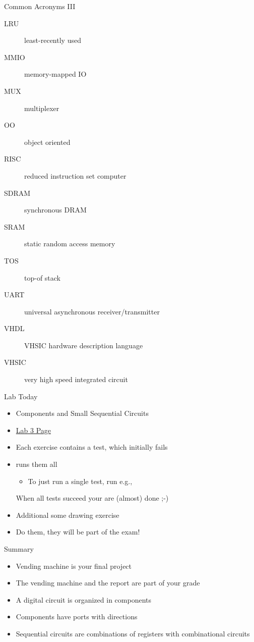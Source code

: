 \begin{frame}[fragile]{Common Acronyms III}
\begin{description}
\item [LRU] least-recently used
\item [MMIO] memory-mapped IO
\item [MUX] multiplexer
\item [OO] object oriented
\item [RISC] reduced instruction set computer
\item [SDRAM] synchronous DRAM
\item [SRAM] static random access memory
\item [TOS] top-of stack
\item [UART] universal asynchronous receiver/transmitter
\item [VHDL] VHSIC hardware description language
\item [VHSIC] very high speed integrated circuit
\end{description}
\end{frame}


\begin{frame}[fragile]{Lab Today}
\begin{itemize}
\item Components and Small Sequential Circuits
\item \href{https://github.com/schoeberl/chisel-lab/tree/master/lab3}{Lab 3 Page}
\item Each exercise contains a test, which initially fails
\item {} runs them all
\begin{itemize}
\item To just run a single test, run e.g.,\\
\end{itemize}
When all tests succeed your are (almost) done ;-)
\item Additional some drawing exercise
\item Do them, they will be part of the exam!
\end{itemize}
\end{frame}

\begin{frame}[fragile]{Summary}
\begin{itemize}
\item Vending machine is your final project
\item The vending machine and the report are part of your grade
\item A digital circuit is organized in components
\item Components have ports with directions
\item Sequential circuits are combinations of registers with combinational circuits
\end{itemize}
\end{frame}



